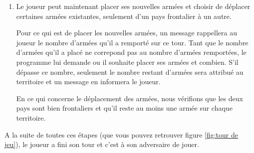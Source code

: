 \begin{enumerate}
    \vspace{0.2cm}
    \item Le joueur peut maintenant placer ses nouvelles armées et choisir de déplacer certaines armées existantes, seulement d'un pays frontalier à un autre.
    
    Pour ce qui est de placer les nouvelles armées, un message rappellera au joueur le nombre d'armées qu'il a remporté sur ce tour. Tant que le nombre d'armées qu'il a placé ne correpond pas au nombre d'armées remportées, le programme lui demande ou il souhaite placer ses armées et combien. S'il dépasse ce nombre, seulement le nombre restant d'armées sera attribué au territoire et un message en informera le joueur.
    
    En ce qui concerne le déplacement des armées, nous vérifions que les deux pays sont bien frontaliers et qu'il reste au moins une armée sur chaque territoire.
    
\end{enumerate}
\vspace{0.2cm}
A la suite de toutes ces étapes (que vous pouvez retrouver figure \ref{fig:tour de jeu}), le joueur a fini son tour et c'est à son adversaire de jouer.

